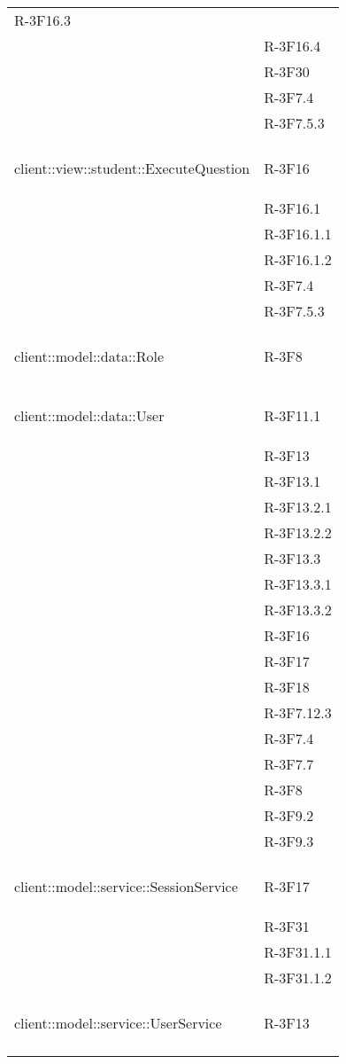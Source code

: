 \begin{longtable}{l p{3cm}}
	R-3F16.3 \tabularnewline &
	
	R-3F16.4 \tabularnewline &
	
	R-3F30 \tabularnewline &
	
	R-3F7.4 \tabularnewline &
	
	R-3F7.5.3 \tabularnewline &\tabularnewline
	\hline
	\hypertarget{client::view::student::ExecuteQuestion}{client::view::student::ExecuteQuestion} & R-3F16 \tabularnewline &
	
	R-3F16.1 \tabularnewline &
	
	R-3F16.1.1 \tabularnewline &
	
	R-3F16.1.2 \tabularnewline &
	
	R-3F7.4 \tabularnewline &
	
	R-3F7.5.3 \tabularnewline &\tabularnewline
	\hline
	\hypertarget{client::model::data::Role}{client::model::data::Role} & R-3F8 \tabularnewline &\tabularnewline
	\hline
	\hypertarget{client::model::data::User}{client::model::data::User} & R-3F11.1 \tabularnewline &
	
	R-3F13 \tabularnewline &
	
	R-3F13.1 \tabularnewline &
	
	R-3F13.2.1 \tabularnewline &
	
	R-3F13.2.2 \tabularnewline &
	
	R-3F13.3 \tabularnewline &
	
	R-3F13.3.1 \tabularnewline &
	
	R-3F13.3.2 \tabularnewline &
	
	R-3F16 \tabularnewline &
	
	R-3F17 \tabularnewline &
	
	R-3F18 \tabularnewline &
	
	R-3F7.12.3 \tabularnewline &
	
	R-3F7.4 \tabularnewline &
	
	R-3F7.7 \tabularnewline &
	
	R-3F8 \tabularnewline &
	
	R-3F9.2 \tabularnewline &
	
	R-3F9.3 \tabularnewline &\tabularnewline
	\hline
	\hypertarget{client::model::service::SessionService}{client::model::service::SessionService} & R-3F17 \tabularnewline &
	
	R-3F31 \tabularnewline &
	
	R-3F31.1.1 \tabularnewline &
	
	R-3F31.1.2 \tabularnewline &\tabularnewline
	\hline
	\hypertarget{client::model::service::UserService}{client::model::service::UserService} & R-3F13 \tabularnewline &
	

\end{longtable}
